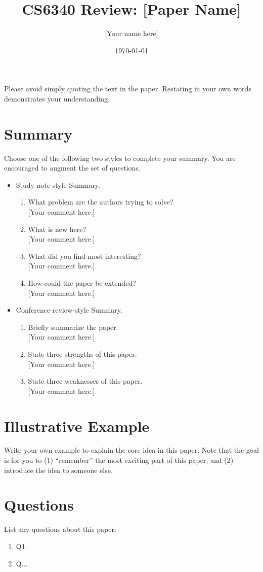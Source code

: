 \documentclass[12pt]{extarticle}
\title{CS6340 Review: [Paper Name]}
\author{[Your name here]}
\date{\today}
\begin{document}
\maketitle

Please avoid simply quoting the text in the paper. Restating in your own words
demonstrates your understanding.
\section{Summary}
Choose one of the following two styles to complete your summary. You are
encouraged to augment the set of questions.
\begin{itemize}
\item Study-note-style Summary.
  \begin{enumerate}
  \item What problem are the authors trying to solve?\\
    {[Your comment here.]}
  \item What is new here?\\
    {[Your comment here.]}
  \item What did you find most interesting?\\
    {[Your comment here.]}
  \item How could the paper be extended?\\
    {[Your comment here.]}
  \end{enumerate}
\item Conference-review-style Summary.
  \begin{enumerate}

  \item Briefly summarize the paper.\\
    {[Your comment here.]}
  \item State three strengths of this paper.\\
    {[Your comment here.]}
  \item State three weaknesses of this paper.\\
    {[Your comment here.]}
  \end{enumerate}
\end{itemize}
\vfill
\pagebreak
\section{Illustrative Example}
Write your own example to explain the core idea in this paper. Note that the
goal is for you to (1) ``remember'' the most exciting part of this paper, and
(2) introduce the idea to someone else.

\pagebreak
\section{Questions}
List any questions about this paper.
\begin{enumerate}
\item Q1.
\item Q...
\end{enumerate}
\end{document}
